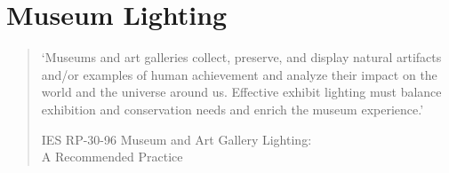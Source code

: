 \section{Museum Lighting}

\begin{quote}
`Museums and art galleries collect, preserve, and display natural artifacts and/or examples of human achievement and analyze their impact on the world and the universe around us. Effective exhibit lighting must balance exhibition and conservation needs and enrich the museum experience.' \\
\begin{flushright}IES RP-30-96 Museum and Art Gallery Lighting: \\A Recommended Practice \citep{ies_ies_1996}\end{flushright}
\end{quote}

